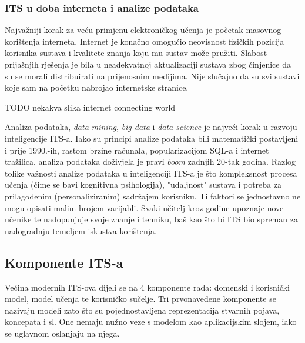 \documentclass[times, utf8, zavrsni]{fer}
\begin{document}
\subsubsection{ITS u doba interneta i analize podataka}
Najvažniji korak za veću primjenu elektroničkog učenja je početak masovnog korištenja interneta. Internet je konačno omogućio neovisnost fizičkih pozicija korisnika sustava i kvalitete znanja koju mu sustav može pružiti. Slabost prijašnjih rješenja je bila u neadekvatnoj aktualizaciji sustava zbog činjenice da su se morali distribuirati na prijenosnim medijima. Nije slučajno da su svi sustavi koje sam na početku nabrojao internetske stranice.
\par  TODO nekakva slika internet connecting world
\par
Analiza podataka, \textit{data mining}, \textit{big data} i \textit{data science} je najveći korak u razvoju inteligencije ITS-a. Iako su principi analize podataka bili matematički postavljeni i prije 1990.-ih, rastom brzine računala, popularizacijom SQL-a i internet tražilica, analiza podataka doživjela je pravi \textit{boom} zadnjih 20-tak godina. Razlog tolike važnosti analize podataka u inteligenciji ITS-a je što kompleksnost procesa učenja (čime se bavi kognitivna psihologija), "udaljnost" sustava i potreba za prilagođenim (personaliziranim) sadržajem korisniku. Ti faktori se jednostavno ne mogu opisati malim brojem varijabli. Svaki učitelj kroz godine upoznaje nove učenike te nadopunjuje svoje znanje i tehniku, baš kao što bi ITS bio spreman za nadogradnju temeljem iskustva korištenja.

\subsection{Komponente ITS-a}
Većina modernih ITS-ova dijeli se na 4 komponente rada: domenski i korisnički model, model učenja te korisničko sučelje. Tri prvonavedene komponente se nazivaju modeli zato što su pojednostavljena reprezentacija stvarnih pojava, koncepata i sl. One nemaju nužno veze s modelom kao aplikacijskim slojem, iako se uglavnom oslanjaju na njega.
\end{document}
